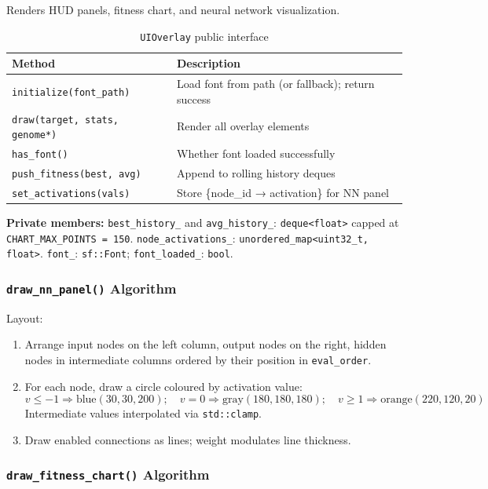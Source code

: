 Renders HUD panels, fitness chart, and neural network visualization.

\begin{table}[H]
\centering\small
\caption{\texttt{UIOverlay} public interface}
\begin{tabularx}{\textwidth}{@{}lX@{}}
\toprule
\textbf{Method} & \textbf{Description} \\
\midrule
\texttt{initialize(font\_path)} & Load font from path (or fallback); return success \\
\texttt{draw(target, stats, genome*)} & Render all overlay elements \\
\texttt{has\_font()} & Whether font loaded successfully \\
\texttt{push\_fitness(best, avg)} & Append to rolling history deques \\
\texttt{set\_activations(vals)} & Store \{node\_id → activation\} for NN panel \\
\bottomrule
\end{tabularx}
\end{table}

\textbf{Private members:}
\texttt{best\_history\_} and \texttt{avg\_history\_}: \texttt{deque<float>} capped at
\texttt{CHART\_MAX\_POINTS = 150}.
\texttt{node\_activations\_}: \texttt{unordered\_map<uint32\_t, float>}.
\texttt{font\_}: \texttt{sf::Font}; \texttt{font\_loaded\_}: \texttt{bool}.

\subsubsection{\texttt{draw\_nn\_panel()} Algorithm}

Layout:
\begin{enumerate}[nosep]
  \item Arrange input nodes on the left column, output nodes on the right, hidden nodes
    in intermediate columns ordered by their position in \texttt{eval\_order}.
  \item For each node, draw a circle coloured by activation value:
    \[
      v \le -1 \Rightarrow \text{blue}(30,30,200); \quad
      v = 0   \Rightarrow \text{gray}(180,180,180); \quad
      v \ge 1 \Rightarrow \text{orange}(220,120,20)
    \]
    Intermediate values interpolated via \texttt{std::clamp}.
  \item Draw enabled connections as lines; weight modulates line thickness.
\end{enumerate}

\subsubsection{\texttt{draw\_fitness\_chart()} Algorithm}

